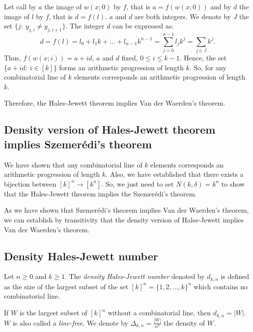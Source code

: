Let call by $a$ the image of $w(x;0)$ by $f$, that is $a=f(w(x;0))$ and by $d$ the image of $l$ by $f$, that is $d=f(l).$ $a$ and $d$ are both integers.  We denote by $J$ the set $\{j: \ y_{j,i}\neq y_{j,i+1} \}.$ The integer $d$ can be expressed as:
$$d=f(l)=l_0+l_1k+\ldots+l_{n-1}k^{n-1}=\sum_{j=0}^{n-1}l_jk^j= \sum_{j\in J} k^j.$$
Thus, $f(w(x;i))=a+id$, $a$ and $d$ fixed, $0\leq i \leq k-1$. Hence, the set $\{a+id: \ i\in [k]\}$ forms an arithmetic progression of length $k.$ So, for any combinatorial line of $k$ elements corresponds an arithmetic progression of length $k.$

Therefore, the Hales-Jewett theorem implies Van der Waerden's theorem.

\subsection{Density version of Hales-Jewett theorem implies Szemerédi's theorem}

We have shown that any combinatorial line of $k$ elements corresponds an arithmetic progression of length $k.$ Also, we have established that there exists a bijection between $[k]^n \longrightarrow [k^n].$ So, we just need to set $N(k,\delta)=k^n$ to show that the Hales-Jewett theorem implies the Szemerédi's theorem.

As we have shown that Szemerédi's theorem implies Van der Waerden's theorem, we can establish by transitivity that the density version of Hales-Jewett implies Van der Waerden's theorem.

\subsection{Density Hales-Jewett number}

\begin{defn} Let $n \geq 0$ and $k \geq 1.$ The \textit{density Hales-Jewett number}	denoted by $d_{k,n}$ is defined as the size of the largest subset of the set $[k]^n=\{1,2, \ldots, k\}^n$ which contains no combinatorial	line. \end{defn}
If $W$ is the largest subset of $[k]^n$ without a combinatorial line, then $d_{k,n}=|W|.$ $W$ is also called a \textit{line-free}. We denote by $\Delta_{k,n}=\frac{|W|}{n^k}$ the density of $W.$

